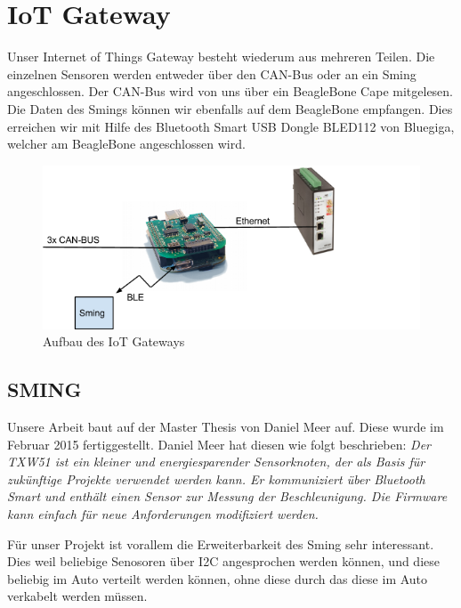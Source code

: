 \chapter{IoT Gateway}\label{chap:iotgateway}

Unser Internet of Things Gateway besteht wiederum aus mehreren Teilen. Die einzelnen Sensoren werden entweder über den CAN-Bus oder an ein Sming angeschlossen. Der CAN-Bus wird von uns über ein BeagleBone Cape mitgelesen. Die Daten des Smings können wir ebenfalls auf dem BeagleBone empfangen. Dies erreichen wir mit Hilfe des Bluetooth Smart USB Dongle BLED112 von Bluegiga, welcher am BeagleBone angeschlossen wird.

\begin{figure}[hbtp]
    \center
    \includegraphics[width=\textwidth]{bilder/aufbau_in_auto.png}
    \caption{Aufbau des IoT Gateways}
    \label{fig:aufbau_iot_gateway}
\end{figure}


\section{SMING}\label{sec:sming}
Unsere Arbeit baut auf der Master Thesis von Daniel Meer auf. Diese wurde im Februar 2015 fertiggestellt. Daniel Meer hat diesen wie folgt beschrieben: \textit{Der TXW51 ist ein kleiner und energiesparender Sensorknoten, der als Basis für zukünftige Projekte verwendet werden kann. Er kommuniziert über Bluetooth Smart und enthält einen Sensor zur Messung der Beschleunigung. Die Firmware kann einfach für neue Anforderungen modifiziert werden.}\cite{meer:masterthesis}

Für unser Projekt ist vorallem die Erweiterbarkeit des Sming sehr interessant. Dies weil beliebige Senosoren über I2C angesprochen werden können, und diese beliebig im Auto verteilt werden können, ohne diese durch das diese im Auto verkabelt werden müssen.



